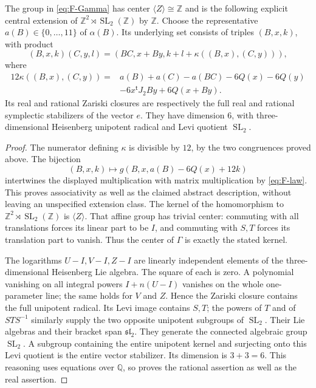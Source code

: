 \begin{proposition}[F.1.2; Proved]\label{st:F.1.2}
The group in \eqref{eq:F-Gamma} has center
$\langle Z\rangle\cong\mathbb Z$ and is the following explicit central
extension of $\mathbb Z^2\rtimes\operatorname{SL}_2(\mathbb Z)$ by
$\mathbb Z$.  Choose the representative $a(B)\in\{0,\ldots,11\}$ of
$\alpha(B)$.  Its underlying set consists of triples $(B,x,k)$, with
product
\[
 (B,x,k)(C,y,l)=(BC,x+By,k+l+\kappa((B,x),(C,y))),
\]
where
\begin{align*}
12\kappa((B,x),(C,y))={}&a(B)+a(C)-a(BC)-6Q(x)-6Q(y)\\
 &-6x^{\mathsf t}J_2By+6Q(x+By).
\end{align*}
Its real and rational Zariski closures are respectively the full real
and rational symplectic stabilizers of the vector $e$.  They have
dimension $6$, with three-dimensional Heisenberg unipotent radical and
Levi quotient $\operatorname{SL}_2$.
\end{proposition}

\begin{proof}
The numerator defining $\kappa$ is divisible by $12$, by the two
congruences proved above.  The bijection
\[
 (B,x,k)\longmapsto g(B,x,a(B)-6Q(x)+12k)
\]
intertwines the displayed multiplication with matrix multiplication by
\eqref{eq:F-law}.  This proves associativity as well as the claimed abstract
description, without leaving an unspecified extension class.  The kernel
of the homomorphism to $\mathbb Z^2\rtimes\operatorname{SL}_2(\mathbb Z)$
is $\langle Z\rangle$.  That affine group has trivial center: commuting
with all translations forces its linear part to be $I$, and commuting
with $S,T$ forces its translation part to vanish.  Thus the center of
$\Gamma$ is exactly the stated kernel.

The logarithms $U-I,V-I,Z-I$ are linearly independent elements of the
three-dimensional Heisenberg Lie algebra.  The square of each is zero.
A polynomial vanishing on all integral powers $I+n(U-I)$ vanishes on
the whole one-parameter line; the same holds for $V$ and $Z$.  Hence the
Zariski closure contains the full unipotent radical.  Its Levi image
contains $S,T$; the powers of $T$ and of $STS^{-1}$ similarly supply the
two opposite unipotent subgroups of $\operatorname{SL}_2$.  Their Lie
algebras and their bracket span $\mathfrak{sl}_2$.  They generate the
connected algebraic group $\operatorname{SL}_2$.  A subgroup containing
the entire unipotent kernel and surjecting onto this Levi quotient is
the entire vector stabilizer.  Its dimension is $3+3=6$.  This reasoning
uses equations over $\mathbb Q$, so proves the rational assertion as
well as the real assertion.
\end{proof}

